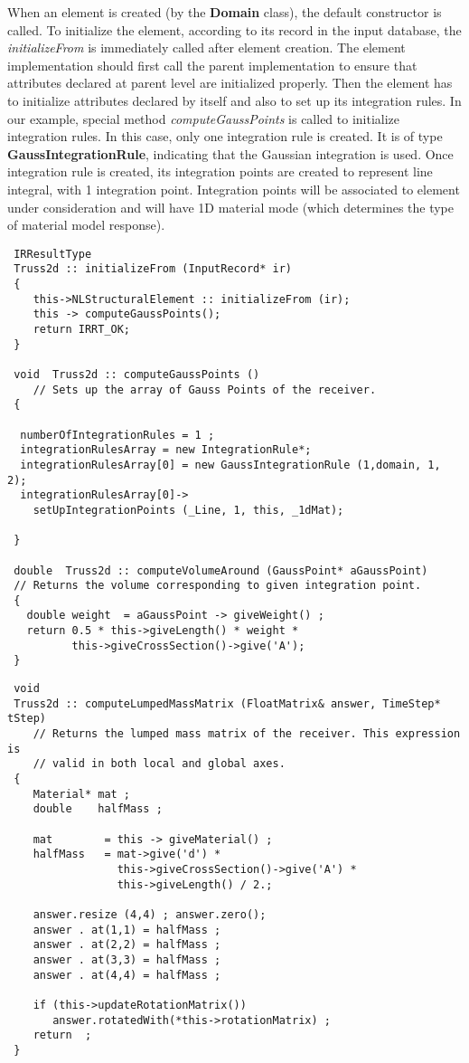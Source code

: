 \documentclass[12pt,draft]{article}
\newcommand{\class}[1]{{\bf #1}}
\newcommand{\service}[1]{{\em #1}}
\begin{document}
 When an element is created (by the \class{Domain} class), the default
 constructor is called. To initialize the element, according to its
 record in the input database, the \service{initializeFrom} is
 immediately called after element creation. The element implementation
 should first call the parent implementation to ensure that attributes
 declared at parent level are initialized properly. Then the element has to
 initialize attributes declared by itself and also to set up its
 integration rules. In our example, special method
 \service{computeGaussPoints} is called to
 initialize integration rules.
 In this case, only one integration rule is created. It is of type 
 \class{GaussIntegrationRule}, indicating that the Gaussian  integration
 is used. Once integration rule is created, its integration points are 
 created to represent line integral, with 1 integration
 point. Integration points will be associated to element under
 consideration and will have 1D material mode (which determines the type of
 material model response).
 \begin{verbatim}
 IRResultType
 Truss2d :: initializeFrom (InputRecord* ir)
 {
    this->NLStructuralElement :: initializeFrom (ir);
    this -> computeGaussPoints();
    return IRRT_OK;
 }

 void  Truss2d :: computeGaussPoints ()
    // Sets up the array of Gauss Points of the receiver.
 {

  numberOfIntegrationRules = 1 ;
  integrationRulesArray = new IntegrationRule*;
  integrationRulesArray[0] = new GaussIntegrationRule (1,domain, 1, 2);
  integrationRulesArray[0]->
    setUpIntegrationPoints (_Line, 1, this, _1dMat);

 }

 double  Truss2d :: computeVolumeAround (GaussPoint* aGaussPoint)
 // Returns the volume corresponding to given integration point. 
 {
   double weight  = aGaussPoint -> giveWeight() ;
   return 0.5 * this->giveLength() * weight * 
          this->giveCrossSection()->give('A');
 }
 \end{verbatim}


 \begin{verbatim}
 void
 Truss2d :: computeLumpedMassMatrix (FloatMatrix& answer, TimeStep* tStep)
    // Returns the lumped mass matrix of the receiver. This expression is
    // valid in both local and global axes.
 {
    Material* mat ;
    double    halfMass ;

    mat        = this -> giveMaterial() ;
    halfMass   = mat->give('d') * 
                 this->giveCrossSection()->give('A') * 
                 this->giveLength() / 2.;

    answer.resize (4,4) ; answer.zero();
    answer . at(1,1) = halfMass ;
    answer . at(2,2) = halfMass ;
    answer . at(3,3) = halfMass ;
    answer . at(4,4) = halfMass ;

    if (this->updateRotationMatrix()) 
       answer.rotatedWith(*this->rotationMatrix) ;
    return  ;
 }
 \end{verbatim}
\end{document}
